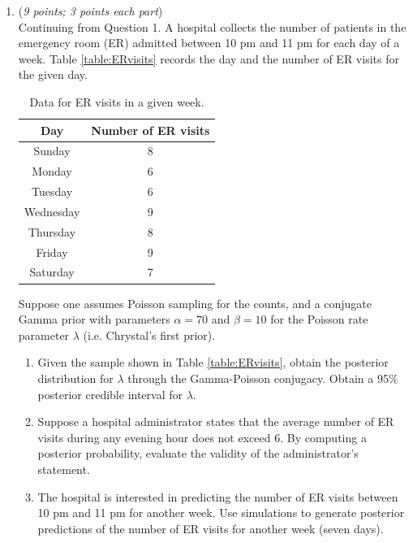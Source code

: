 \documentclass[11pt]{article}
\begin{document}
\begin{enumerate}
 \item
    ({\it{9 points; 3 points each part}}) \\
    Continuing from Question 1. A hospital collects the number of patients in the emergency room (ER) admitted between 10 pm and 11 pm for each day of a week. Table \ref{table:ERvisits} records the day and the number of ER visits for the given day.

\begin{table}[htb]
\caption{\label{table:ERvisits} Data for ER visits in a given week.}
\begin{center}
\begin{tabular}{|c|c|} \hline
Day & Number of ER visits\\ \hline
Sunday & 8 \\
Monday & 6 \\
Tuesday & 6 \\
Wednesday & 9 \\
Thursday & 8 \\
Friday & 9 \\
Saturday & 7 \\ \hline
\end{tabular}
\end{center}
\label{default}
\end{table}%

Suppose one assumes Poisson sampling for the counts, and a conjugate Gamma prior with parameters $\alpha = 70$ and $\beta = 10$ for the Poisson rate parameter $\lambda$ (i.e. Chrystal's first prior).

\begin{enumerate}

\item Given the sample shown in Table \ref{table:ERvisits}, obtain the posterior distribution for $\lambda$ through the Gamma-Poisson conjugacy. Obtain a 95\% posterior credible interval for $\lambda$. 

\item Suppose a hospital administrator states that the average number of ER visits during any evening hour does not exceed 6.  By computing a posterior probability, evaluate the validity of the administrator's statement.

\item The hospital is interested in predicting the number of ER visits between 10 pm and 11 pm for another week. Use simulations to generate posterior predictions of the number of ER visits for another week (seven days).

\end{enumerate}




\end{enumerate}
\end{document}
